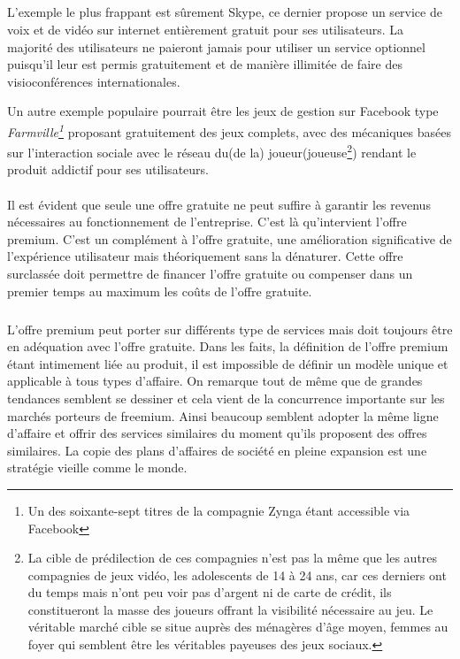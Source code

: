 \documentclass[11pt, a4paper ]{article}
\begin{document}
\begin{spacing}{1.5}
\subparagraph{} %
L'exemple le plus frappant est sûrement Skype, ce dernier propose un service de voix et de vidéo sur internet entièrement gratuit pour ses utilisateurs. La majorité des utilisateurs ne paieront jamais pour utiliser un service optionnel puisqu'il leur est permis gratuitement et de manière illimitée de faire des visioconférences internationales.

Un autre exemple populaire pourrait être les jeux de gestion sur Facebook type \emph{Farmville\footnote{Un des soixante-sept titres de la compagnie Zynga étant accessible via Facebook}} proposant gratuitement des jeux complets, avec des mécaniques basées sur l'interaction sociale avec le réseau du(de la) joueur(joueuse\footnote{La cible de prédilection de ces compagnies n'est pas la même que les autres compagnies de jeux vidéo, les adolescents de 14 à 24 ans, car ces derniers ont du temps mais n'ont peu voir pas d'argent ni de carte de crédit, ils constitueront la masse des joueurs offrant la visibilité nécessaire au jeu. Le véritable marché cible se situe auprès des ménagères d'âge moyen, femmes au foyer qui semblent être les véritables payeuses des jeux sociaux.}) rendant le produit addictif pour ses utilisateurs.

\paragraph{} %
Il est évident que seule une offre gratuite ne peut suffire à garantir les revenus nécessaires au fonctionnement de l'entreprise. C'est là qu'intervient l'offre premium. C'est un complément à l'offre gratuite, une amélioration significative de l’expérience utilisateur mais théoriquement sans la dénaturer. Cette offre surclassée doit permettre de financer l'offre gratuite ou compenser dans un premier temps au maximum les coûts de l'offre gratuite.
\subparagraph{}
L'offre premium peut porter sur différents type de services mais doit toujours être en adéquation avec l'offre gratuite. Dans les faits, la définition de l'offre premium étant intimement liée au produit, il est impossible de définir un modèle unique et applicable à tous types d'affaire. On remarque tout de même que de grandes tendances semblent se dessiner et cela vient de la concurrence importante sur les marchés porteurs de freemium. Ainsi beaucoup semblent adopter la même ligne d'affaire et offrir des services similaires du moment qu'ils proposent des offres similaires. La copie des plans d'affaires de société en pleine expansion est une stratégie vieille comme le monde.


\end{spacing}
\end{document}
